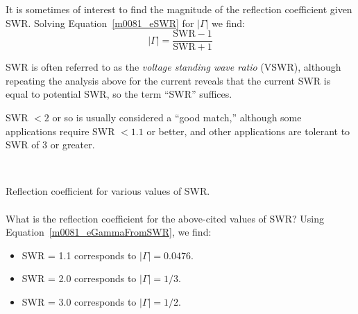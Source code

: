 It is sometimes of interest to find the magnitude of the reflection coefficient given SWR.  Solving Equation~\ref{m0081_eSWR} for $\left|\Gamma\right|$ we find:
%
\begin{equation}
\left|\Gamma\right| = \frac{\mbox{SWR}-1}{\mbox{SWR}+1}
\label{m0081_eGammaFromSWR}
\end{equation}
 
SWR is often referred to as the \emph{voltage standing wave ratio} 
(VSWR), although repeating the analysis above for the current reveals that the current SWR is equal to potential SWR, so the term ``SWR'' suffices.

SWR $<2$ or so is usually considered a ``good match,'' although some applications require SWR $<1.1$ or better, and other applications are tolerant to SWR of 3 or greater.

~\\ \begin{example} 
\begin{mdframed}[backgroundcolor=brown!20,linecolor=brown!20]\raggedright
Reflection coefficient for various values of SWR.
\\~\\
What is the reflection coefficient for the above-cited values of SWR?
Using Equation~\ref{m0081_eGammaFromSWR}, we find:
%
\begin{itemize}
\item SWR = 1.1 corresponds to $\left|\Gamma\right|=0.0476$.
\item SWR = 2.0 corresponds to $\left|\Gamma\right|=1/3$.
\item SWR = 3.0 corresponds to $\left|\Gamma\right|=1/2$.
\end{itemize}
\end{mdframed}\end{example}


